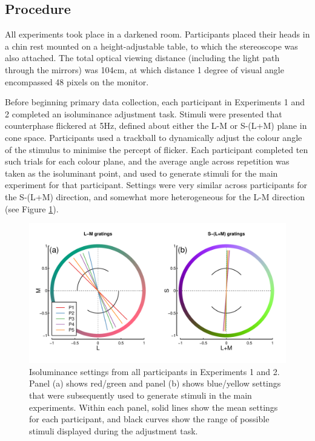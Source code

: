 \documentclass[
]{article}
\begin{document}
\hypertarget{procedure}{%
\subsection{Procedure}\label{procedure}}

All experiments took place in a darkened room. Participants placed their heads in a chin rest mounted on a height-adjustable table, to which the stereoscope was also attached. The total optical viewing distance (including the light path through the mirrors) was 104cm, at which distance 1 degree of visual angle encompassed 48 pixels on the monitor.

Before beginning primary data collection, each participant in Experiments 1 and 2 completed an isoluminance adjustment task. Stimuli were presented that counterphase flickered at 5Hz, defined about either the L-M or S-(L+M) plane in cone space. Participants used a trackball to dynamically adjust the colour angle of the stimulus to minimise the percept of flicker. Each participant completed ten such trials for each colour plane, and the average angle across repetition was taken as the isoluminant point, and used to generate stimuli for the main experiment for that participant. Settings were very similar across participants for the S-(L+M) direction, and somewhat more heterogeneous for the L-M direction (see Figure \ref{fig:isofig}).

\begin{figure}

{\centering \includegraphics{Figures/isosettings} 

}

\caption{Isoluminance settings from all participants in Experiments 1 and 2. Panel (a) shows red/green and panel (b) shows blue/yellow settings that were subsequently used to generate stimuli in the main experiments. Within each panel, solid lines show the mean settings for each participant, and black curves show the range of possible stimuli displayed during the adjustment task.}\label{fig:isofig}
\end{figure}
\end{document}
